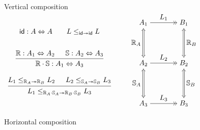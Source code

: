 \documentclass[aspectratio=141]{beamer}
\newcommand{\kw}[1]{\ensuremath{ \mathsf{#1} }}
\begin{document}
\begin{frame}{Vertical composition}
  \centering
  $\begin{array}{c}
    \kw{id} : A \Leftrightarrow A
    \qquad
    L \le_{\kw{id} \twoheadrightarrow \kw{id}} L
    \\[2em]
    {\begin{prooftree}
      \hypo{\mathbb{R} : A_1 \Leftrightarrow A_2}
      \hypo{\mathbb{S} : A_2 \Leftrightarrow A_3}
      \infer2{\mathbb{R} \cdot \mathbb{S} : A_1 \Leftrightarrow A_3}
    \end{prooftree}}
    \\[2em]
    {\begin{prooftree}
      \hypo{L_1 \le_{\mathbb{R}_A \twoheadrightarrow \mathbb{R}_B} L_2}
      \hypo{L_2 \le_{\mathbb{S}_A \twoheadrightarrow \mathbb{S}_B} L_3}
      \infer2{
        L_1 \le_{\mathbb{R}_A \cdot \mathbb{S}_A \twoheadrightarrow
                 \mathbb{R}_B \cdot \mathbb{S}_B} L_3}
    \end{prooftree}}
  \end{array}
  \qquad
  \begin{tikzpicture}[baseline,scale=1]
    \node (A1) at (-1,  2) {$A_1$};
    \node (A2) at (-1,  0) {$A_2$};
    \node (A3) at (-1, -2) {$A_3$};
    \node (B1) at ( 1,  2) {$B_1$};
    \node (B2) at ( 1,  0) {$B_2$};
    \node (B3) at ( 1, -2) {$B_3$};
    \draw (A1) edge[->>] node[auto] {$L_1$} (B1);
    \draw (A2) edge[->>] node[auto] {$L_2$} (B2);
    \draw (A3) edge[->>] node[auto] {$L_3$} (B3);
    \begin{scope}[double equal sign distance, {Implies[]}-{Implies[]}]
      \draw (A1) edge[double] node[auto,swap] {$\mathbb{R}_A$} (A2);
      \draw (B1) edge[double] node[auto] {$\mathbb{R}_B$} (B2);
      \draw (A2) edge[double] node[auto,swap] {$\mathbb{S}_A$} (A3);
      \draw (B2) edge[double] node[auto] {$\mathbb{S}_B$} (B3);
    \end{scope}
  \end{tikzpicture}
  $
\end{frame}

\begin{frame}{Horizontal composition}
\end{frame}
\end{document}
